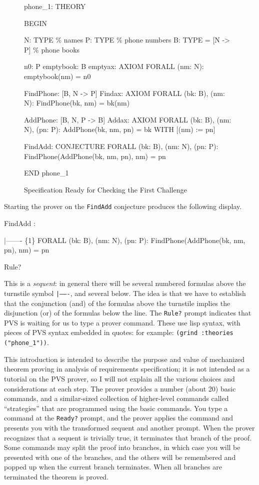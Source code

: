 \begin{figure}[htbp]
\begin{jmrsession}
phone_1: THEORY

BEGIN

  N: TYPE              \% names
  P: TYPE              \% phone numbers
  B: TYPE = [N -> P]   \% phone books

  n0: P
  emptybook: B
  emptyax: AXIOM   FORALL (nm: N): emptybook(nm) = n0

  FindPhone: [B, N -> P]
  Findax: AXIOM   FORALL (bk: B), (nm: N):  FindPhone(bk, nm) = bk(nm)

  AddPhone: [B, N, P -> B]
  Addax: AXIOM   FORALL (bk: B), (nm: N), (pn: P): 
     AddPhone(bk, nm, pn) = bk WITH [(nm) := pn]

  FindAdd: CONJECTURE  FORALL (bk: B), (nm: N), (pn: P):
    FindPhone(AddPhone(bk, nm, pn), nm) = pn

END phone_1
\end{jmrsession}
\caption{\label{fig1}Specification Ready for Checking the First Challenge}
\end{figure}

Starting the prover on the {\tt FindAdd} conjecture produces the following
display.
\begin{jmrsession}
FindAdd :  

  |-------
\{1\}   FORALL (bk: B), (nm: N), (pn: P): FindPhone(AddPhone(bk, nm, pn), nm) = pn

Rule? 
\end{jmrsession}
This is a {\em sequent\/}: in general there will be several numbered
formulas above the turnstile symbol {\tt |-------}, and several below.
The idea is that we have to establish that the conjunction (and) of the
formulas above the turnstile implies the disjunction (or) of the
formulas below the line.  The {\tt Rule?} prompt indicates that PVS is
waiting for us to type a prover command.  These use lisp syntax, with
pieces of PVS syntax embedded in quotes: for example:
\mbox{\tt (grind :theories ("phone\_1"))}.

This introduction is intended to describe the purpose and value of
mechanized theorem proving in analysis of requirements specification;
it is not intended as a tutorial on the PVS prover, so I will not
explain all the various choices and considerations at each step.  The
prover provides a number (about 20) basic commands, and a
similar-sized collection of higher-level commands called
``strategies'' that are programmed using the basic commands.  You type
a command at the {\tt Ready?} prompt, and the prover applies the
command and presents you with the transformed sequent and another
prompt.  When the prover recognizes that a sequent is trivially true,
it terminates that branch of the proof.  Some commands may split the
proof into branches, in which case you will be presented with one of
the branches, and the others will be remembered and popped up when the
current branch terminates.  When all branches are terminated the
theorem is proved.

